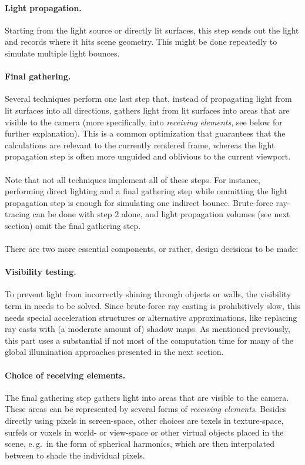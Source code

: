 \paragraph{Light propagation.}
Starting from the light source or directly lit surfaces, this step sends out the light and records where it hits scene geometry. This might be done repeatedly to simulate multiple light bounces.

\paragraph{Final gathering.}
Several techniques perform one last step that, instead of propagating light from lit surfaces into all directions, gathers light from lit surfaces into areas that are visible to the camera (more specifically, into \textit{receiving elements}, see below for further explanation). This is a common optimization that guarantees that the calculations are relevant to the currently rendered frame, whereas the light propagation step is often more unguided and oblivious to the current viewport.
\\
\\
Note that not all techniques implement all of these steps. For instance, performing direct lighting and a final gathering step while ommitting the light propagation step is enough for simulating one indirect bounce. Brute-force ray-tracing can be done with step 2 alone, and light propagation volumes (see next section) omit the final gathering step.
\\
\\
There are two more essential components, or rather, design decisions to be made:

\paragraph{Visibility testing.}
To prevent light from incorrectly shining through objects or walls, the visibility term in  needs to be solved. Since brute-force ray casting is prohibitively slow, this needs special acceleration structures or alternative approximations, like replacing ray casts with (a moderate amount of) shadow maps. As mentioned previously, this part uses a substantial if not most of the computation time for many of the global illumination approaches presented in the next section.

\paragraph{Choice of receiving elements.}
The final gathering step gathers light into areas that are visible to the camera. These areas can be represented by several forms of \textit{receiving elements}. Besides directly using pixels in screen-space, other choices are texels in texture-space, surfels or voxels in world- or view-space or other virtual objects placed in the scene, e.\,g.\ in the form of spherical harmonics, which are then interpolated between to shade the individual pixels.

